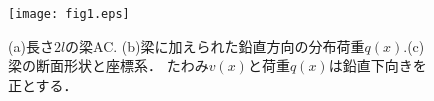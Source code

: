 \documentclass[10pt,a4j]{jarticle}
\begin{document}
\begin{figure}[h]
	\begin{center}
	\texttt{[image: fig1.eps]} 
	\end{center}
	\caption{(a)長さ$2l$の梁AC. (b)梁に加えられた鉛直方向の分布荷重$q(x)$.(c)梁の断面形状と座標系．
        たわみ$v(x)$と荷重$q(x)$は鉛直下向きを正とする．}
	\label{fig:fig1}
\end{figure}
\end{document}

